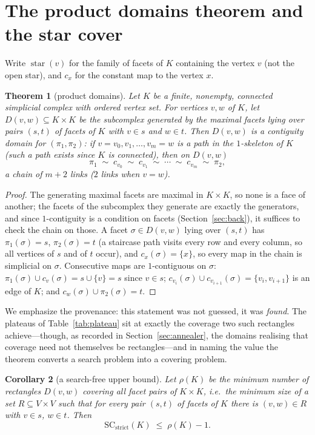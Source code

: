\documentclass[12pt]{article}
\newcommand{\SC}{\mathrm{SC}}
\newcommand{\SCst}{\SC_{\mathrm{strict}}}
\newtheorem{theo}{Theorem}[section]
\newtheorem{corollary}[theo]{Corollary}
\begin{document}
\section{The product domains theorem and the star cover}\label{sec:products}

Write $\operatorname{star}(v)$ for the family of facets of $K$ containing
the vertex $v$ (not the open star), and $c_x$ for the constant map to the vertex $x$.

\begin{theo}[product domains]\label{thm:prod}
Let $K$ be a finite, nonempty, connected simplicial complex with
ordered vertex set.  For vertices $v,w$ of $K$, let $D(v,w)\subseteq K\times K$ be the
subcomplex generated by the maximal facets lying over pairs $(s,t)$ of
facets of $K$ with $v\in s$ and $w\in t$.  Then $D(v,w)$ is a
contiguity domain for
$(\pi_1,\pi_2)$: if $v=v_0,v_1,\dots,v_m=w$ is a path in the
$1$-skeleton of $K$ (such a path exists since $K$ is connected), then on $D(v,w)$
\[
\pi_1 \;\sim\; c_{v_0}\;\sim\; c_{v_1}\;\sim\;\cdots\;\sim\;
c_{v_m}\;\sim\; \pi_2,
\]
a chain of $m+2$ links ($2$ links when $v=w$).
\end{theo}

\begin{proof}
The generating maximal facets are maximal in $K\times K$, so none is a
face of another; the facets of the subcomplex they generate are exactly
the generators, and since $1$-contiguity is a condition on facets
(Section~\ref{sec:back}), it suffices to check the chain on those.  A
facet $\sigma\in D(v,w)$ lying over $(s,t)$ has $\pi_1(\sigma)=s$,
$\pi_2(\sigma)=t$ (a staircase path visits every row and every column,
so all vertices of $s$ and of $t$ occur), and $c_x(\sigma)=\{x\}$, so
every map in the chain is simplicial on $\sigma$.  Consecutive maps are
$1$-contiguous on $\sigma$: $\pi_1(\sigma)\cup c_v(\sigma)=s\cup\{v\}=s$
since $v\in s$; $c_{v_i}(\sigma)\cup c_{v_{i+1}}(\sigma)=\{v_i,v_{i+1}\}$
is an edge of $K$; and $c_w(\sigma)\cup\pi_2(\sigma)=t$.
\end{proof}

We emphasize the provenance: this statement was not guessed, it was
\emph{found}.  The plateaus of Table~\ref{tab:plateau} sit at exactly
the coverage two such rectangles achieve---though, as recorded in
Section~\ref{sec:annealer}, the domains realising that coverage need not
themselves be rectangles---and in naming the value the theorem converts
a search problem into a covering problem.

\begin{corollary}[a search-free upper bound]\label{cor:rho}
Let $\rho(K)$ be the minimum number of rectangles $D(v,w)$ covering all
facet pairs of $K\times K$, i.e.\ the minimum size of a set
$R\subseteq V\times V$ such that for every pair $(s,t)$ of facets of
$K$ there is $(v,w)\in R$ with $v\in s$, $w\in t$.  Then
\[
\SCst(K)\;\le\;\rho(K)-1.
\]
\end{corollary}
\end{document}

